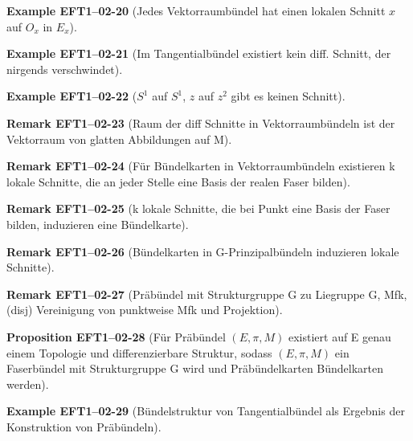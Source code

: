 \documentclass[10pt, letterpaper]{article}
\newcommand{\CustomHeading}[3]{%
  \par\medskip\noindent%
  \textbf{#1 #2} \textnormal{(#3)}.\enskip%
}
\newenvironment{PROP}[2]{\CustomHeading{Proposition}{#1}{#2}}{}
\newenvironment{REM}[2]{\CustomHeading{Remark}{#1}{#2}}{}
\newenvironment{EXA}[2]{\CustomHeading{Example}{#1}{#2}}{}
\begin{document}
\begin{EXA}{EFT1--02-20}{Jedes Vektorraumbündel hat einen lokalen Schnitt $x$ auf $O_x$ in $E_x$}
\end{EXA}

\begin{EXA}{EFT1--02-21}{Im Tangentialbündel existiert kein diff. Schnitt, der nirgends verschwindet}
\end{EXA}

\begin{EXA}{EFT1--02-22}{$S^1$ auf $S^1$, $z$ auf $z^2$ gibt es keinen Schnitt}
\end{EXA}

\begin{REM}{EFT1--02-23}{Raum der diff Schnitte in Vektorraumbündeln ist der Vektorraum von glatten Abbildungen auf M}
\end{REM}

\begin{REM}{EFT1--02-24}{Für Bündelkarten in Vektorraumbündeln existieren k lokale Schnitte, die an jeder Stelle eine Basis der realen Faser bilden}
\end{REM}

\begin{REM}{EFT1--02-25}{k lokale Schnitte, die bei Punkt eine Basis der Faser bilden, induzieren eine Bündelkarte}
\end{REM}

\begin{REM}{EFT1--02-26}{Bündelkarten in G-Prinzipalbündeln induzieren lokale Schnitte}
\end{REM}

\begin{REM}{EFT1--02-27}{Präbündel mit Strukturgruppe G zu Liegruppe G, Mfk, (disj) Vereinigung von punktweise Mfk und Projektion}
\end{REM}

\begin{PROP}{EFT1--02-28}{Für Präbündel $(E,\pi,M)$ existiert auf E genau einem Topologie und differenzierbare Struktur, sodass $(E,\pi,M)$ ein Faserbündel mit Strukturgruppe G wird und Präbündelkarten Bündelkarten werden}
\end{PROP}

\begin{EXA}{EFT1--02-29}{Bündelstruktur von Tangentialbündel als Ergebnis der Konstruktion von Präbündeln}
\end{EXA}
\end{document}
